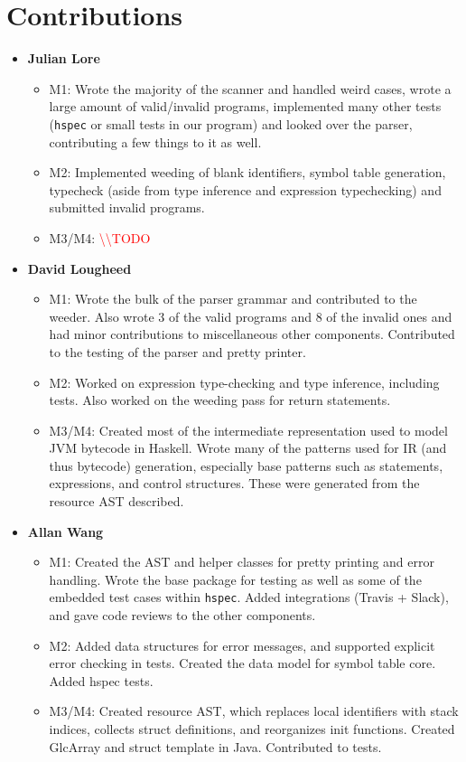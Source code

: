 \documentclass[11pt]{article}
\newcommand{\todo}[0]{\textcolor{red}{\textbackslash\textbackslash TODO \ }}
\begin{document}
\section{Contributions}
\begin{itemize}
	\item \textbf{Julian Lore}
	\begin{itemize}
		\item M1: Wrote the majority of the scanner and
		handled weird cases, wrote a large amount of valid/invalid programs,
		implemented many other tests (\texttt{hspec} or small tests in our
		program) and looked over the parser, contributing a few things to it
		as well.
		\item M2: Implemented weeding of blank identifiers,
		symbol table generation, typecheck (aside from type inference and
		expression typechecking) and submitted invalid programs.
		\item M3/M4: \todo%
	\end{itemize}
	\item \textbf{David Lougheed}
	\begin{itemize}
		\item M1: Wrote the bulk of the parser grammar
		and contributed to the weeder. Also wrote 3 of the valid programs
		and 8 of the invalid ones and had minor contributions to
		miscellaneous other components.  Contributed to the testing of the
		parser and pretty printer.
		\item M2: Worked on expression type-checking and
		type inference, including tests. Also worked on the weeding pass for
		return statements.
		\item M3/M4: Created most of the intermediate representation used to
		model JVM bytecode in Haskell. Wrote many of the patterns used for IR
		(and thus bytecode) generation, especially base patterns such as
		statements, expressions, and control structures. These were generated
		from the resource AST described.
	\end{itemize}
	\item \textbf{Allan Wang}
	\begin{itemize}
		\item M1: Created the AST and helper classes for
		pretty printing and error handling.  Wrote the base package for
		testing as well as some of the embedded test cases within
		\texttt{hspec}.  Added integrations (Travis + Slack), and gave code
		reviews to the other components.
		\item M2: Added data structures for error messages,
		and supported explicit error checking in tests. Created the data
		model for symbol table core. Added hspec tests.
		\item M3/M4: Created resource AST, which replaces local identifiers with stack indices, collects struct definitions, and reorganizes init functions. Created GlcArray and struct template in Java. Contributed to tests.
	\end{itemize}
\end{itemize}
\end{document}
